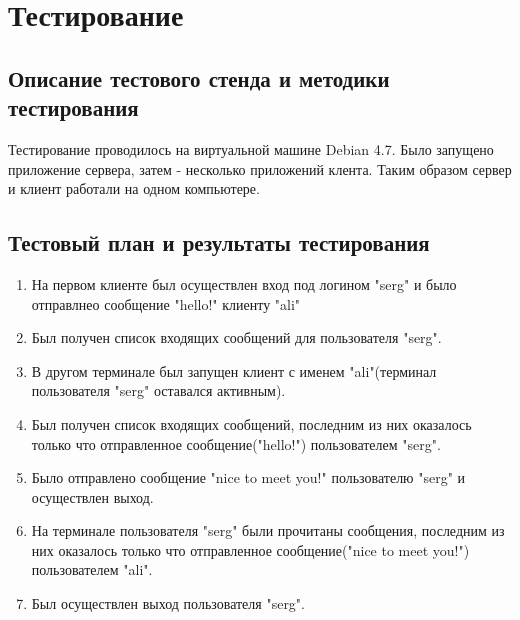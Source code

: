 \documentclass[12pt,a4paper]{report}
\begin{document}
\section{Тестирование}
\subsection{Описание тестового стенда и методики тестирования}
Тестирование проводилось на виртуальной машине Debian 4.7. Было запущено приложение сервера, затем - несколько приложений клента. Таким образом сервер и клиент работали на одном компьютере.
\subsection{Тестовый план и результаты тестирования}
\begin{enumerate}
\item На первом клиенте был осуществлен вход под логином "serg" и было отправлнео сообщение "hello!" клиенту "ali"
\item Был получен список входящих сообщений для пользователя "serg".
\item В другом терминале был запущен клиент с именем "ali"(терминал пользователя "serg" оставался активным).
\item Был получен список входящих сообщений, последним из них оказалось только что отправленное сообщение("hello!") пользователем "serg".
\item Было отправлено сообщение "nice to meet you!" пользователю "serg" и осуществлен выход.
\item На терминале пользователя "serg" были прочитаны сообщения, последним из них оказалось только что отправленное сообщение("nice to meet you!") пользователем "ali".
\item Был осуществлен выход пользователя "serg".
\end{enumerate}
\end{document}
